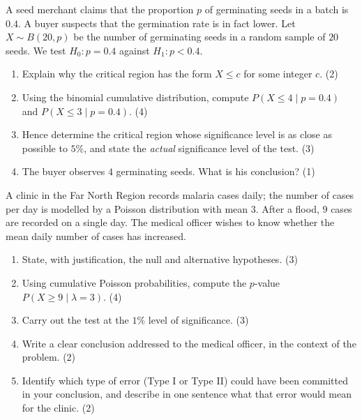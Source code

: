 \documentclass[11pt]{article}
\begin{document}
\begin{exercice}
A seed merchant claims that the proportion $p$ of germinating seeds in a batch is $0.4$. A buyer suspects that the germination rate is in fact lower. Let $X \sim B(20, p)$ be the number of germinating seeds in a random sample of $20$ seeds. We test $H_0: p = 0.4$ against $H_1: p < 0.4$.
\begin{enumerate}
\item Explain why the critical region has the form $X \leq c$ for some integer $c$. \hfill (2)
\item Using the binomial cumulative distribution, compute $P(X \leq 4 \mid p = 0.4)$ and $P(X \leq 3 \mid p = 0.4)$. \hfill (4)
\item Hence determine the critical region whose significance level is as close as possible to $5\%$, and state the \emph{actual} significance level of the test. \hfill (3)
\item The buyer observes $4$ germinating seeds. What is his conclusion? \hfill (1)
\end{enumerate}
\end{exercice}

\begin{exercice}
A clinic in the Far North Region records malaria cases daily; the number of cases per day is modelled by a Poisson distribution with mean $3$. After a flood, $9$ cases are recorded on a single day. The medical officer wishes to know whether the mean daily number of cases has increased.
\begin{enumerate}
\item State, with justification, the null and alternative hypotheses. \hfill (3)
\item Using cumulative Poisson probabilities, compute the $p$-value $P(X \geq 9 \mid \lambda = 3)$. \hfill (4)
\item Carry out the test at the $1\%$ level of significance. \hfill (3)
\item Write a clear conclusion addressed to the medical officer, in the context of the problem. \hfill (2)
\item Identify which type of error (Type I or Type II) could have been committed in your conclusion, and describe in one sentence what that error would mean for the clinic. \hfill (2)
\end{enumerate}
\end{exercice}

\newpage
\end{document}
